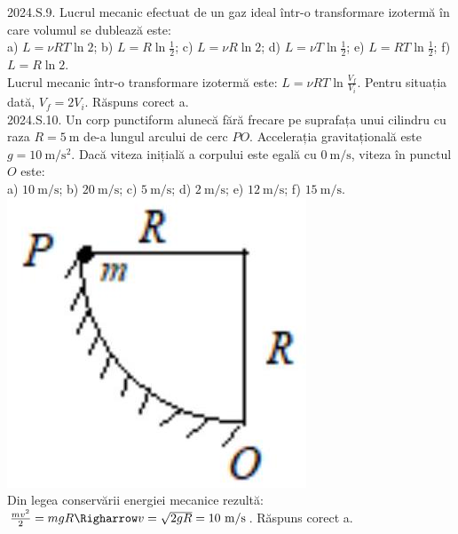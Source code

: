 2024.S.9. Lucrul mecanic efectuat de un gaz ideal într-o transformare izotermă în care volumul se dublează este:\\ a) $L=\nu R T \ln 2$; b) $L=R \ln \frac{1}{2}$; c) $L=\nu R \ln 2$; d) $L=\nu T \ln \frac{1}{2}$; e) $L=R T \ln \frac{1}{2}$; f) $L=R \ln 2$.\\ Lucrul mecanic într-o transformare izotermă este: $L=\nu R T \ln \frac{V_{f}}{V_{i}}$. Pentru situația dată, $V_{f}=2 V_{i}$. Răspuns corect a.\\

2024.S.10. Un corp punctiform alunecă fără frecare pe suprafața unui cilindru cu raza $R=5 \mathrm{~m}$ de-a lungul arcului de cerc $PO$. Accelerația gravitațională este $g=10 \mathrm{~m} / \mathrm{s}^{2}$. Dacă viteza inițială a corpului este egală cu $0 \mathrm{~m} / \mathrm{s}$, viteza în punctul $O$ este:\\ a) $10 \mathrm{~m} / \mathrm{s}$; b) $20 \mathrm{~m} / \mathrm{s}$; c) $5 \mathrm{~m} / \mathrm{s}$; d) $2 \mathrm{~m} / \mathrm{s}$; e) $12 \mathrm{~m} / \mathrm{s}$; f) $15 \mathrm{~m} / \mathrm{s}$.\\ \includegraphics[width=0.4\linewidth]{images/2025_08_27_3bb07d46e3cd56c9410dg-2}\\ Din legea conservării energiei mecanice rezultă:\\ $\frac{m v^{2}}{2}=m g R \Righarrow v=\sqrt{2 g R}=10 \mathrm{~m} / \mathrm{s}$. Răspuns corect a.\\

